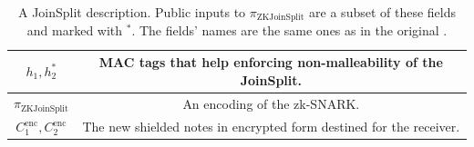\documentclass{article}
\begin{document}
\begin{center}
\begin{table}
{\begin{tabular}{ |c|c| }
        \hline
        \rule{0pt}{4ex} {\small $h_1, h_2^\ast$} & MAC tags that help enforcing non-malleability of the JoinSplit. \\
        \hline
        \rule{0pt}{4ex} {\small $\pi_\text{ZKJoinSplit}$} & An encoding of the zk-SNARK. \\
        \hline
        \rule{0pt}{4ex} {\small $C_1^\text{enc}, C_2^\text{enc}$} & The new shielded notes in encrypted form destined for the receiver. \\
        \hline
\end{tabular}}
\caption{A JoinSplit description. Public inputs to $\pi_\text{ZKJoinSplit}$ are a subset of these fields and marked with $^\ast$. The fields' names are the same ones as in the original \protect\cite{hopwood:zcash}.} \label{fig:joinsplit}
\end{table}
\end{center}
\end{document}
